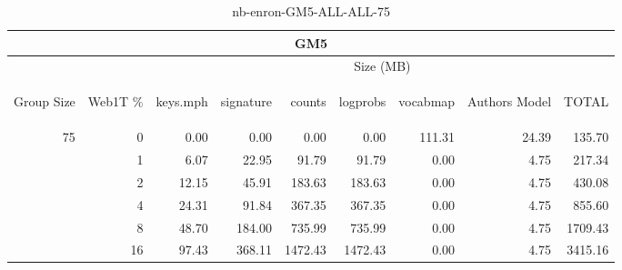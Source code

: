 \begin{center}
\begin{table}[htbp]
\begin{tabular}{ | r | r | r | r | r | r | r | r | r |}
\hline
\multicolumn{9}{|c|}{GM5}\\
\hline
 & & \multicolumn{7}{|c|}{Size (MB)}\\ \cline{3-9}
\begin{sideways}Group Size\end{sideways} & \begin{sideways}Web1T \% \end{sideways} & \begin{sideways}keys.mph\end{sideways} & \begin{sideways}signature\end{sideways} & \begin{sideways}counts\end{sideways} & \begin{sideways}logprobs\end{sideways} & \begin{sideways}vocabmap\end{sideways} & \begin{sideways}Authors Model \end{sideways} & \begin{sideways}TOTAL\end{sideways}\\
\hline
\multirow{5}{*}{75}
 & 0 & 0.00 & 0.00 & 0.00 & 0.00 & 111.31 & 24.39 & 135.70\\ \cline{2-9}
 & 1 & 6.07 & 22.95 & 91.79 & 91.79 & 0.00 & 4.75 & 217.34\\ \cline{2-9}
 & 2 & 12.15 & 45.91 & 183.63 & 183.63 & 0.00 & 4.75 & 430.08\\ \cline{2-9}
 & 4 & 24.31 & 91.84 & 367.35 & 367.35 & 0.00 & 4.75 & 855.60\\ \cline{2-9}
 & 8 & 48.70 & 184.00 & 735.99 & 735.99 & 0.00 & 4.75 & 1709.43\\ \cline{2-9}
 & 16 & 97.43 & 368.11 & 1472.43 & 1472.43 & 0.00 & 4.75 & 3415.16\\ \cline{2-9}
\hline
\end{tabular}
\caption{nb-enron-GM5-ALL-ALL-75}
\label{table:nb-enron-GM5-ALL-ALL-75}
\end{table}
\end{center}

